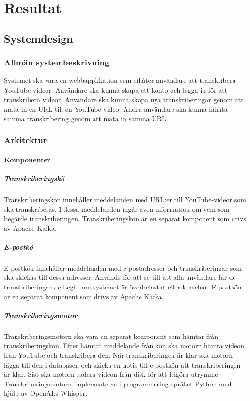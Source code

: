 \chapter{Resultat}

\section{Systemdesign}

\subsection{Allmän systembeskrivning}
Systemet ska vara en webbapplikation som tillåter användare att transkribera
YouTube-videor. Användare ska kunna skapa ett konto och logga in för att
transkribera videor. Användare ska kunna skapa nya transkriberingar genom att
mata in en URL till en YouTube-video. Andra användare ska kunna hämta samma
transkribering genom att mata in samma URL. 

\subsection{Arkitektur}

\subsubsection{Komponenter}

\paragraph{Transkriberingskö}
Transkriberingskön innehåller meddelanden med URL:er till YouTube-videor som
ska transkriberas. I dessa meddelanden ingår även information om vem som
begärde transkriberingen. Transkriberingskön är en separat komponent som drivs
av Apache Kafka.

\paragraph{E-postkö}
E-postkön innehåller meddelanden med e-postadresser och transkriberingar som
ska skickas till dessa adresser. Används för att se till att alla användare
får de transkriberingar de begär om systemet är överbelastat eller kraschar.
E-postkön är en separat komponent som drivs av Apache Kafka.

\paragraph{Transkriberingsmotor}
Transkriberingsmotorn ska vara en separat komponent som hämtar från
transkriberingskön. Efter hämtat meddelande från kön ska motorn hämta videon
från YouTube och transkribera den. När transkriberingen är klar ska motorn
lägga till den i databasen och skicka en notis till e-postkön att
transkriberingen är klar. Sist ska motorn radera videon från disk för att
frigöra utrymme. Transkriberingsmotorn implementeras i programmeringsspråket
Python med hjälp av OpenAI:s Whisper.

